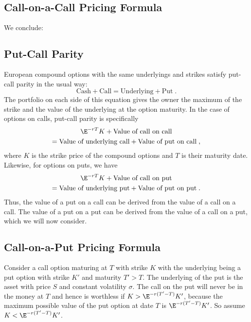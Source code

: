 \subsection*{Call-on-a-Call Pricing Formula}

We conclude:


\subsection*{Put-Call Parity}

European compound options with the same underlyings and strikes satisfy put-call parity in the usual way:
$$\text{Cash} + \text{Call} = \text{Underlying} + \text{Put}\; .$$
The portfolio on each side of this equation gives the owner the maximum of the strike and the value of the underlying at the option maturity.  In the case of options on calls, put-call parity is specifically
\begin{multline*}
\E^{-rT}K + \text{Value of call on call} \\= \text{Value of underlying call} + \text{Value of put on call}\; ,
\end{multline*}
where $K$ is the strike price of the compound options and $T$ is their maturity date.  Likewise, for options on puts, we have
\begin{multline*}
\E^{-rT}K + \text{Value of call on put} \\= \text{Value of underlying put} + \text{Value of put on put}\; .
\end{multline*}
Thus, the value of a put on a call can be derived from the value of a call on a call.  The value of a put on a put can be derived from the value of a call on a put, which we will now consider.

\subsection*{Call-on-a-Put Pricing Formula}

Consider a call option maturing at $T$ with strike $K$ with the underlying being a put option with strike $K'$ and maturity $T'>T$.  The underlying of the put is the asset with price $S$ and constant volatility $\sigma$.  The call on the put will never be in the money at $T$ and hence is worthless if $K> \E^{-r(T'-T)}K'$, because the maximum possible value of the put option at date $T$ is $\E^{-r(T'-T)}K'$.  So assume $K< \E^{-r(T'-T)}K'$.  

